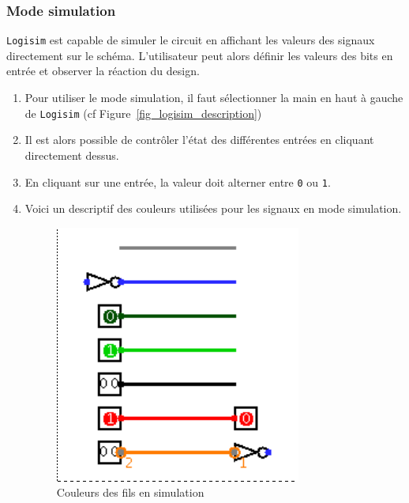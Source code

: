 \documentclass{article}
\begin{document}

    \subsubsection{Mode simulation}
    \texttt{Logisim} est capable de simuler le circuit en affichant les valeurs des signaux directement sur le schéma.
    L'utilisateur
    peut alors définir les valeurs des bits en entrée et observer la réaction du design.
    \begin{enumerate}
        \item Pour utiliser le mode simulation, il faut sélectionner la main en haut à gauche de \texttt{Logisim} (cf
        Figure~\ref{fig_logisim_description})

        \item Il est alors possible de contrôler l'état des différentes entrées en cliquant directement dessus.

        \item En cliquant sur une entrée, la valeur doit alterner entre \texttt{0} ou \texttt{1}.

        \item Voici un descriptif des couleurs utilisées pour les signaux en mode simulation.
        \begin{figure}[H]
            \begin{center}
                \includegraphics[scale=0.4]{pictures/logisim_couleurs.png}
                \caption{\label{fig_logisim_couleur}Couleurs des fils en simulation}
            \end{center}
        \end{figure}


\end{enumerate}
\end{document}
